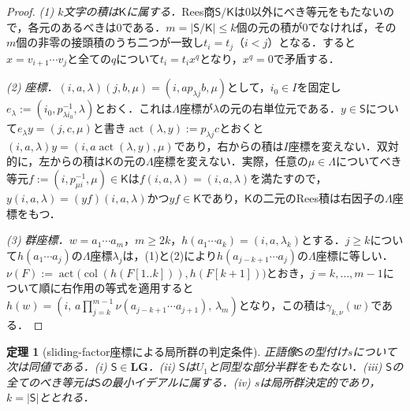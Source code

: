\documentclass[11pt,a4paper]{ltjsarticle}
\numberwithin{equation}{section}
\theoremstyle{plain}
\newtheorem{theorem}{定理}[section]
\theoremstyle{definition}
\theoremstyle{remark}
\begin{document}
\begin{proof}
\emph{(1) $k$文字の積は$\mathsf K$に属する．}Rees商$\mathsf S/\mathsf K$は$0$以外にべき等元をもたないので，各元のあるべきは$0$である．$m=|\mathsf S/\mathsf K|\le k$個の元の積が$0$でなければ，その$m$個の非零の接頭積のうち二つが一致し$t_i=t_j$（$i<j$）となる．すると$x=v_{i+1}\cdots v_j$と全ての$q$について$t_i=t_ix^q$となり，$x^q=0$で矛盾する．

\emph{(2) 座標．}$(i,a,\lambda)(j,b,\mu)=(i,ap_{\lambda j}b,\mu)$として，$i_0\in I$を固定し$e_\lambda:=(i_0,p_{\lambda i_0}^{-1},\lambda)$とおく．これは$\Lambda$座標が$\lambda$の元の右単位元である．$y\in \mathsf S$について$e_\lambda y=(j,c,\mu)$と書き$\operatorname{act}(\lambda,y):=p_{\lambda j}c$とおくと$(i,a,\lambda)y=(i,a\operatorname{act}(\lambda,y),\mu)$であり，右からの積は$I$座標を変えない．双対的に，左からの積は$\mathsf K$の元の$\Lambda$座標を変えない．実際，任意の$\mu\in\Lambda$についてべき等元$f:=(i,p_{\mu i}^{-1},\mu)\in\mathsf K$は$f(i,a,\lambda)=(i,a,\lambda)$を満たすので，$y(i,a,\lambda)=(yf)(i,a,\lambda)$かつ$yf\in\mathsf K$であり，$\mathsf K$の二元のRees積は右因子の$\Lambda$座標をもつ．

\emph{(3) 群座標．}$w=a_1\cdots a_m$，$m\ge2k$，$h(a_1\cdots a_k)=(i,a,\lambda_k)$とする．$j\ge k$について$h(a_1\cdots a_j)$の$\Lambda$座標$\lambda_j$は，(1)と(2)により$h(a_{j-k+1}\cdots a_j)$の$\Lambda$座標に等しい．$\nu(F):=\operatorname{act}\bigl(\operatorname{col}(h(F[1..k])),h(F[k+1])\bigr)$とおき，$j=k,\ldots,m-1$について順に右作用の等式を適用すると$h(w)=(i,\,a\prod_{j=k}^{m-1}\nu(a_{j-k+1}\cdots a_{j+1}),\,\lambda_m)$となり，この積は$\gamma_{k,\nu}(w)$である．
\end{proof}

\begin{theorem}[sliding-factor座標による局所群の判定条件]
\label{thm:lg-characterization}
正語像$\mathsf S$の型付け$s$について次は同値である．(i) $\mathsf S\in\mathbf{LG}$．(ii) $\mathsf S$は$U_1$と同型な部分半群をもたない．(iii) $\mathsf S$の全てのべき等元は$\mathsf S$の最小イデアルに属する．(iv) $s$は局所群決定的であり，$k=|\mathsf S|$ととれる．
\end{theorem}
\end{document}
